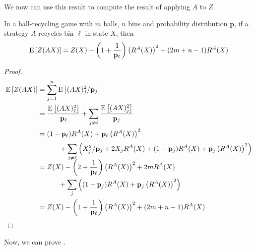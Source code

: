 We now can use this result to compute the result of applying $A$ to $Z$. 
\begin{lemma}
   In a ball-recycling game with $m$ balls, $n$ bins and probability
   distribution $\mathbf{p}$, if a strategy $A$ recycles bin $\ell$ in state
   $X$, then
   \[\mathrm{E}\left[Z(AX)\right]=Z(X) - \left(1+\frac{1}{\mathbf{p}_\ell}\right)\left(R^A(X)\right)^2 + (2m+n-1)R^A(X)\]
\end{lemma}

\begin{proof}
   \begin{align*}
      \E{Z(AX)} &= \sum_{j=1}^n \E{(AX)_j^2/\p_j} \\
		&= \frac{\E{(AX)_\ell^2}}{\p_\ell} + \sum_{j \neq \ell} \frac{\E{(AX)_j^2}}{\p_j} \\
		&= \begin{multlined}[t][6.25cm](1-\p_\ell)R^A(X) + \p_\ell\left(R^A(X)\right)^2 \\[0.75ex]
			\vspace*{-1.5ex}\shoveleft[0.25cm]{+ \sum_{j \neq \ell} \left( X_j^2/\p_j + 2X_jR^A(X)} + (1-\p_j)R^A(X) + \p_j\left(R^A(X)\right)^2 \right) \end{multlined} \\
		&= Z(X) - \left(2 + \frac{1}{\p_\ell}\right)\left(R^A(X)\right)^2 + 2mR^A(X) \\
		&\qquad\quad+ \sum_j \left((1-\p_j)R^A(X) + \p_j\left(R^A(X)\right)^2\right) \\
		&= Z(X) - \left(1+\frac{1}{\p_\ell}\right)\left(R^A(X)\right)^2 + (2m+n-1)R^A(X)
   \end{align*}
\end{proof}

Now, we can prove .

